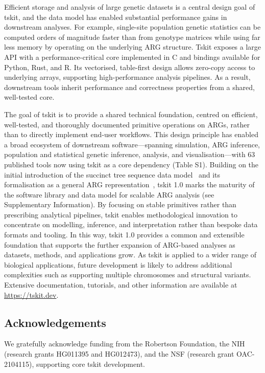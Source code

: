 \documentclass{article}
\begin{document}
Efficient storage and analysis of large genetic datasets is a central
design goal of tskit, and the data model has enabled substantial
performance gains in downstream analyses.
For example, single-site
population genetic statistics can be computed orders of magnitude faster than from
genotype matrices while using far less memory by operating
on the underlying ARG structure\cite{ralph2020efficiently}.
Tskit exposes a large API with a
performance-critical core implemented in C and bindings available for Python,
Rust, and R.
Its vectorised, table-first design allows zero-copy access to
underlying arrays, supporting high-performance analysis pipelines.
As a result,
downstream tools inherit performance and correctness properties from a shared,
well-tested core.


The goal of tskit is to provide a shared technical foundation, centred on
efficient, well-tested, and thoroughly documented primitive operations on ARGs, rather
than to directly implement end-user workflows.
This design principle has enabled a broad ecosystem of downstream
software---spanning simulation, ARG inference, population and statistical genetic
inference, analysis, and visualisation---with 63 published tools now using tskit
as a core dependency (Table S1).
Building on the initial introduction of the succinct tree sequence
data model~\cite{kelleher2016efficient}
and its formalisation as a general ARG representation~\cite{wong2024general},
tskit 1.0 marks the maturity of the software library and data model
for scalable ARG analysis (see Supplementary Information).
By focusing on stable
primitives rather than prescribing analytical pipelines, tskit enables
methodological innovation to concentrate on modelling, inference, and
interpretation rather than bespoke data formats and tooling.
In this way, tskit 1.0 provides
a common and extensible foundation that supports the further expansion of
ARG-based analyses as datasets, methods, and applications grow.
As tskit is applied to a wider range of biological applications, future development
is likely to address additional complexities such as supporting multiple
chromosomes and structural variants.
Extensive documentation, tutorials, and other information are available
at \url{https://tskit.dev}.

\subsection*{Acknowledgements}
We gratefully acknowledge funding from the Robertson Foundation,
the NIH (research grants HG011395 and HG012473),
and the NSF (research grant OAC-2104115),
supporting core tskit development.


\end{document}
